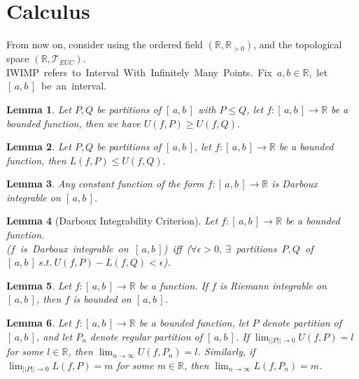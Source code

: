 \documentclass[11pt]{article}
\theoremstyle{break}
\theoremstyle{break}
\newtheorem{lem}{Lemma}[thm]
\newcommand{\R}{\mathbb{R}}
\newcommand{\T}{\mathcal{T}}
\newcommand{\Intab}{[\,a,b\,]}
\begin{document}
	
	
	
	
	
	
	
	
	
	
	
	
	
	
	
	
	
	
	
	
	
	
	
\section{\color{red} Calculus}
	\color{red} \noindent From now on, consider using the ordered field $(\R,\R_{>0})$, and the topological space $(\R, \T_{EUC})$.\\ \mbox{IWIMP refers to Interval With Infinitely Many Points. Fix $a,b \in \R$, let $[\,a,b\,]$ be an interval.} \color{black}
	
	\begin{lem}
		Let $P,Q$ be partitions of $[\,a,b\,]$ with $P \leq Q$, let $f:\Intab \to \R$ be a bounded function, then we have $U(f,P) \geq U(f,Q)$.
	\end{lem}

	\begin{lem}
		Let $P,Q$ be partitions of $\Intab$, let $f:\Intab \to \R$ be a bounded function, then $L(f,P) \leq U(f,Q)$.
	\end{lem}
	
	\begin{lem}
		Any constant function of the form $f:\Intab \to \R$ is Darboux integrable on $\Intab$.
	\end{lem}
	
	\begin{lem}[Darboux Integrability Criterion]
		Let $f:\Intab \to \R$ be a bounded function.\\ \mbox{($f$ is Darboux integrable on $\Intab$) iff ($\forall \epsilon >0,  \ \exists$ partitions $P,Q$ of $\Intab \ s.t. \ U(f,P)-L(f,Q)<\epsilon$).}
	\end{lem}
	
	\begin{lem}
		Let $f:\Intab \to \R$ be a function. If $f$ is Riemann integrable on $\Intab$, then $f$ is bounded on $\Intab$.
	\end{lem}
	
	\begin{lem}
		Let $f:\Intab \to \R$ be a bounded function, let $P$ denote partition of $\Intab$, and let $P_n$ denote regular partition of $\Intab$. If $\lim_{||P|| \to 0} U(f,P) =l$ for some $l \in \R$, then $\lim_{n \to \infty} U(f,P_n) =l$. Similarly, if $\lim_{||P|| \to 0} L(f,P) =m$ for some $m \in \R$, then $\lim_{n \to \infty} L(f,P_n) =m$.
	\end{lem}
	
\end{document}
